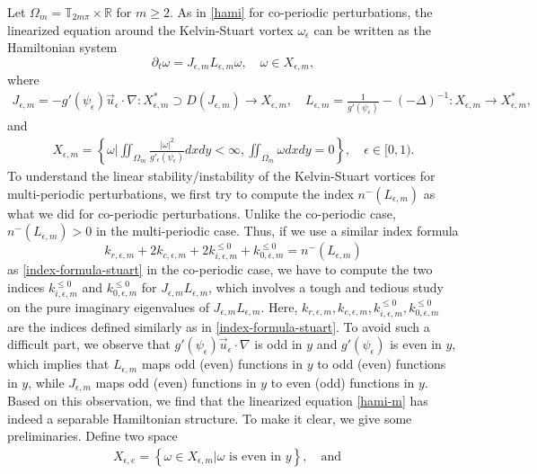 \documentclass[1 [leqno, 11pt]{amsart}
\numberwithin{equation}{section}
\let\ep=\epsilon
\begin{document}
\begin{CJK*}{GBK}{song}
Let $\Omega_m = \mathbb{T}_{2m\pi} \times \mathbb{R}$ for $m\geq2$.
As in  \eqref{hami} for co-periodic perturbations, the linearized equation around the Kelvin-Stuart vortex $\omega_\ep$ can be written as
the  Hamiltonian system
 \begin{equation}\label{hami-m}
 \partial_t \omega = J_{\epsilon,m} L_{\epsilon,m}\omega, \quad \omega \in X_{\ep,m},
 \end{equation}
 where
 \begin{align*}
 J_{\ep,m} = -g'(\psi_\epsilon)\vec{u}_\epsilon\cdot\nabla: X_{\ep,m}^* \supset D(J_{\epsilon,m}) \rightarrow X_{\ep,m}, \quad
 L_{\epsilon,m} = \frac {1} {g'(\psi_\ep)} - (-\Delta)^{-1}: X_{\ep,m} \rightarrow X_{\ep,m}^*,\end{align*}
 and
\begin{align*}
X_{\ep,m} = \left\{\omega\bigg| \iint_{\Omega_m} \frac{|\omega|^2}{g'_\epsilon(\psi_\epsilon)} dxdy < \infty, \iint_{\Omega_m} \omega dxdy = 0 \right\},\quad \epsilon\in[0,1).
\end{align*}
To understand the linear stability/instability of the Kelvin-Stuart vortices for  multi-periodic perturbations, we first try to compute the index $n^-(L_{\ep,m})$ as what we did  for  co-periodic perturbations. Unlike the co-periodic case, $n^-(L_{\ep,m})>0$ in the multi-periodic case. Thus, if we use a similar index formula 
 $$
k_{r,\ep,m} + 2k_{c,\ep,m}+2k_{i,\ep,m}^{\leq0}+k_{0,\ep,m}^{\leq0} = n^-(L_{\ep,m})
$$
  as \eqref{index-formula-stuart} in the co-periodic case,
we have to compute the two indices
$k_{i,\ep,m}^{\leq0}$ and $k_{0,\ep,m}^{\leq0}$ for $J_{\epsilon,m} L_{\epsilon,m}$, which involves a tough and tedious  study  on the pure imaginary eigenvalues of $J_{\epsilon,m} L_{\epsilon,m}$. Here, $k_{r,\ep,m}, k_{c,\ep,m}, k_{i,\ep,m}^{\leq0}, k_{0,\ep,m}^{\leq0}$ are the indices defined similarly as in \eqref{index-formula-stuart}.
To avoid such a difficult part, we  observe that $g'(\psi_\epsilon)\vec{u}_\epsilon\cdot\nabla$ is odd in $y$ and  $ g'(\psi_\epsilon)$ is even in $y$, which implies that $L_{\epsilon,m}$ maps  odd (even) functions in $y$ to  odd (even) functions in $y$, while  $J_{\epsilon,m}$ maps odd (even) functions in $y$ to even (odd) functions in $y$. Based on this observation, we find that the linearized equation \eqref{hami-m} has indeed a separable  Hamiltonian structure. To make it clear, we give some preliminaries. Define two space
\begin{align*}
X_{\ep, e} = \left\{ \omega \in X_{\ep,m} | \omega \text{ is even in }y \right\},\quad\text{and}\quad

\end{align*}
\end{CJK*}
\end{document}
